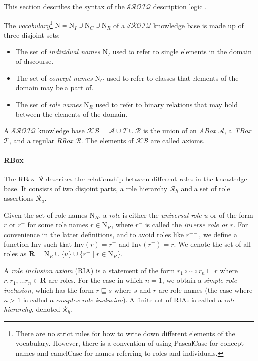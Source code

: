 
This section describes the syntax of the $\mathcal{SROIQ}$ description logic \cite{horrocks2006even}.

The \emph{vocabulary}\footnote{There are no strict rules for how to write down different elements of the vocabulary. However, there is a convention of using PascalCase for concept names and camelCase for names referring to roles and individuals.} $\mathrm{N} = \mathrm{N}_I \cup \mathrm{N}_C \cup \mathrm{N}_R$ of a $\mathcal{SROIQ}$ knowledge base is made up of three disjoint sets:

\begin{itemize}
    \item The set of \emph{individual names} $\mathrm{N}_I$ used to refer to single elements in the domain of discourse.
    \item The set of \emph{concept names} $\mathrm{N}_C$ used to refer to classes that elements of the domain may be a part of.
    \item The set of \emph{role names} $\mathrm{N}_R$ used to refer to binary relations that may hold between the elements of the domain.
\end{itemize}

A $\mathcal{SROIQ}$ knowledge base $\mathcal{KB} = \mathcal{A} \cup \mathcal{T} \cup \mathcal{R}$ is the union of an \emph{ABox} $\mathcal{A}$, a \emph{TBox} $\mathcal{T}$, and a regular \emph{RBox} $\mathcal{R}$. The elements of $\mathcal{KB}$ are called axioms.

\paragraph{RBox} \label{rbox}

The RBox $\mathcal{R}$ describes the relationship between different roles in the knowledge base. It consists of two disjoint parts, a role hierarchy $\mathcal{R}_h$ and a set of role assertions $\mathcal{R}_a$.

Given the set of role names $\mathrm{N}_R$, a \emph{role} is either the \emph{universal role} $u$ or of the form $r$ or $r^-$ for some role names $r \in \mathrm{N}_R$, where $r^-$ is called the \emph{inverse role or} $r$. For convenience in the latter definitions, and to avoid roles like $r^{--}$, we define a function $\mathrm{Inv}$ such that $\mathrm{Inv}(r) = r^-$ and $\mathrm{Inv}(r^-) = r$. We denote the set of all roles as $\mathbf{R} = \mathrm{N}_R \cup \{ u \} \cup \{ r^- \mid r \in \mathrm{N}_R \}$.

A \emph{role inclusion axiom} (RIA) is a statement of the form $r_1 \circ \cdots \circ r_n \sqsubseteq r$ where $r, r_1, \dots r_n \in \mathbf{R}$ are roles. For the case in which $n = 1$, we obtain a \emph{simple role inclusion}, which has the form $r \sqsubseteq s$ where $s$ and $r$ are role names (the case where $n > 1$ is called a \emph{complex role inclusion}). A finite set of RIAs is called a \emph{role hierarchy}, denoted $\mathcal{R}_h$.

